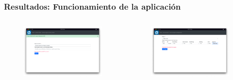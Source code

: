 \begin{frame}[plain,label=demo]
    \frametitle{Resultados: Funcionamiento de la aplicación}
    \begin{columns}
        \begin{column}{0.5\textwidth}
            \begin{figure}[H]
                \includegraphics[width=\textwidth]{include/app_images/project_created.png}
            \end{figure}
        \end{column}
        \begin{column}{0.5\textwidth}
            \begin{figure}[H]
                \includegraphics[width=\textwidth]{include/app_images/create_target.png}
            \end{figure}
        \end{column}
    \end{columns}
    
\end{frame}

